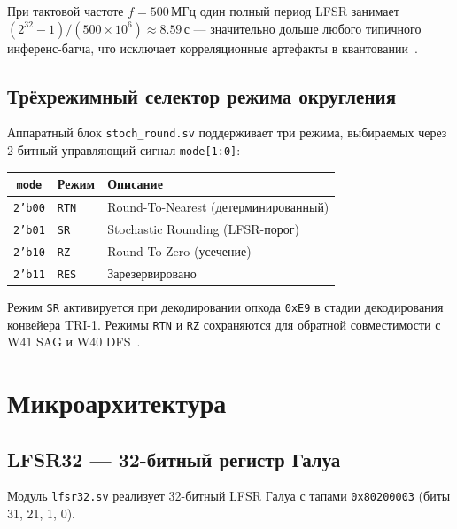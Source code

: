 При тактовой частоте $f = 500\,\text{МГц}$ один полный период
LFSR занимает $(2^{32}-1)/(500 \times 10^6) \approx 8{.}59\,\text{с}$
— значительно дольше любого типичного инференс-батча,
что исключает корреляционные артефакты в квантовании~\cite{gupta2015}.

\subsection{Трёхрежимный селектор режима округления}
\label{ssec:glava88-mode-selector}

Аппаратный блок \texttt{stoch\_round.sv} поддерживает три режима,
выбираемых через 2-битный управляющий сигнал \texttt{mode[1:0]}:

\begin{center}
\begin{tabular}{|c|l|l|}
\hline
\texttt{mode} & Режим & Описание \\
\hline
\texttt{2'b00} & \texttt{RTN} & Round-To-Nearest (детерминированный) \\
\texttt{2'b01} & \texttt{SR}  & Stochastic Rounding (LFSR-порог) \\
\texttt{2'b10} & \texttt{RZ}  & Round-To-Zero (усечение) \\
\texttt{2'b11} & \texttt{RES} & Зарезервировано \\
\hline
\end{tabular}
\end{center}

Режим \texttt{SR} активируется при декодировании опкода
\texttt{0xE9} в стадии декодирования конвейера TRI-1.
Режимы \texttt{RTN} и \texttt{RZ} сохраняются для
обратной совместимости с W41 SAG и W40 DFS~\cite{trios895,trios898}.

\section{Микроархитектура}
\label{sec:glava88-micro}

\subsection{LFSR32 — 32-битный регистр Галуа}
\label{ssec:glava88-lfsr32}

Модуль \texttt{lfsr32.sv} реализует 32-битный LFSR Галуа
с тапами \texttt{0x80200003} (биты 31, 21, 1, 0).

